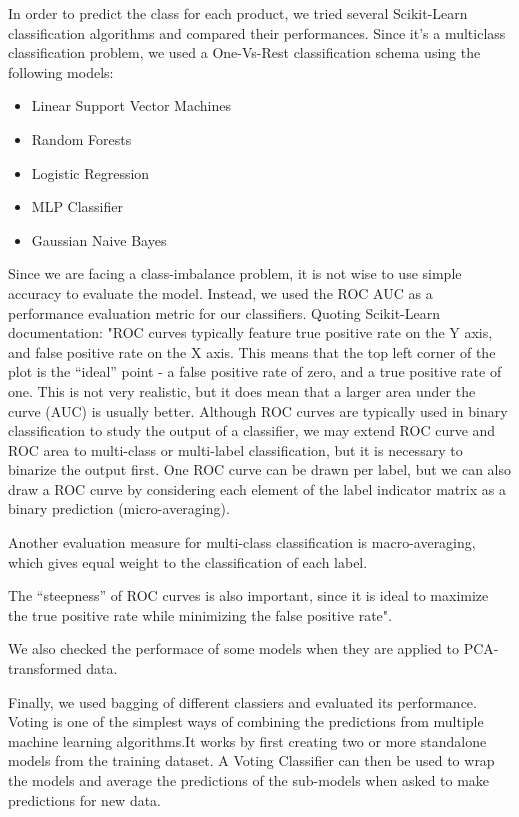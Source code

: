 \documentclass[a4paper,english,12pt]{article}
\begin{document}
In order to predict the class for each product, we tried several Scikit-Learn classification algorithms and compared their performances. Since it's a multiclass classification problem, we used a One-Vs-Rest classification schema  using the following models:
\begin{itemize}
\item Linear Support Vector Machines
\item Random Forests
\item Logistic Regression
\item MLP Classifier
\item Gaussian Naive Bayes
\end{itemize}

Since we are facing a class-imbalance problem, it is not wise to use simple accuracy to evaluate the model. Instead, we used the ROC AUC as a performance evaluation metric for our classifiers. Quoting Scikit-Learn documentation: "ROC curves typically feature true positive rate on the Y axis, and false positive rate on the X axis. This means that the top left corner of the plot is the “ideal” point - a false positive rate of zero, and a true positive rate of one. This is not very realistic, but it does mean that a larger area under the curve (AUC) is usually better. Although ROC curves are typically used in binary classification to study the output of a classifier, we may extend ROC curve and ROC area to multi-class or multi-label classification, but it is necessary to binarize the output first. One ROC curve can be drawn per label, but we can also draw a ROC curve by considering each element of the label indicator matrix as a binary prediction (micro-averaging).

Another evaluation measure for multi-class classification is macro-averaging, which gives equal weight to the classification of each label.

The “steepness” of ROC curves is also important, since it is ideal to maximize the true positive rate while minimizing the false positive rate".

We also checked the performace of some models when they are applied to PCA-transformed data. 

Finally, we used bagging of different classiers and evaluated its performance. Voting is one of the simplest ways of combining the predictions from multiple machine learning algorithms.It works by first creating two or more standalone models from the training dataset. A Voting Classifier can then be used to wrap the models and average the predictions of the sub-models when asked to make predictions for new data.
\end{document}
